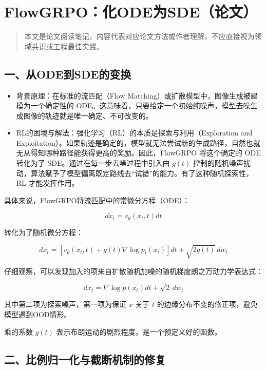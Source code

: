 \clearpage

\hypertarget{flowgrpoux5316odeux4e3asdeux8bbaux6587}{%
\section{FlowGRPO：化ODE为SDE（论文）}\label{flowgrpoux5316odeux4e3asdeux8bbaux6587}}

\begin{quote}
本文是论文阅读笔记，内容代表对应论文方法或作者理解，不应直接视为领域共识或工程最佳实践。
\end{quote}

\hypertarget{ux4e00ux4eceodeux5230sdeux7684ux53d8ux6362}{%
\subsection{一、从ODE到SDE的变换}\label{ux4e00ux4eceodeux5230sdeux7684ux53d8ux6362}}

\begin{itemize}
\tightlist
\item
  背景原理：在标准的流匹配（Flow Matching）或扩散模型中，图像生成被建模为一个确定性的 ODE。这意味着，只要给定一个初始纯噪声，模型去噪生成图像的轨迹就是唯一确定、不可改变的。
\item
  RL的困境与解法：强化学习（RL）的本质是探索与利用（Exploration and Exploitation）。如果轨迹是确定的，模型就无法尝试新的生成路径，自然也就无从得知哪种路径能获得更高的奖励。因此，FlowGRPO 将这个确定的 ODE 转化为了 SDE。通过在每一步去噪过程中引入由 \(g(t)\) 控制的随机噪声扰动，算法赋予了模型偏离既定路线去``试错''的能力。有了这种随机探索性，RL 才能发挥作用。
\end{itemize}

具体来说，FlowGRPO将流匹配中的常微分方程（ODE）：

\[
dx_t=v_\theta(x_t,t)dt
\]

转化为了随机微分方程：

\[
dx_t=\left[v_\theta(x_t,t)+g(t)\nabla\log p_t(x_t)\right]dt+\sqrt{2g(t)}\,dw_t
\]

仔细观察，可以发现加入的项来自扩散随机加噪的随机梯度朗之万动力学表达式：

\[
dx_t=\nabla\log p(x_t)dt+\sqrt{2}\,dw_t
\]

其中第二项为探索噪声，第一项为保证 \(x\) 关于 \(t\) 的边缘分布不变的修正项，避免模型遇到OOD情形。

乘的系数 \(g(t)\) 表示布朗运动的剧烈程度，是一个预定义好的函数。

\hypertarget{ux4e8cux6bd4ux4f8bux5f52ux4e00ux5316ux4e0eux622aux65adux673aux5236ux7684ux4feeux590d}{%
\subsection{二、比例归一化与截断机制的修复}\label{ux4e8cux6bd4ux4f8bux5f52ux4e00ux5316ux4e0eux622aux65adux673aux5236ux7684ux4feeux590d}}

